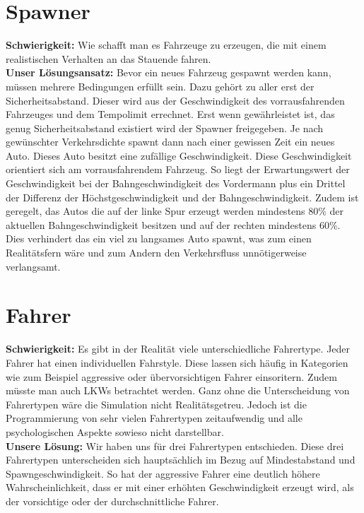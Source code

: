 \section{Spawner}
\textbf{Schwierigkeit:} Wie schafft man es Fahrzeuge zu erzeugen, die mit einem realistischen Verhalten an das Stauende fahren.\\
\textbf{Unser Lösungsansatz:} Bevor ein neues Fahrzeug gespawnt werden kann, müssen mehrere Bedingungen erfüllt sein. Dazu gehört zu aller erst der Sicherheitsabstand. Dieser wird aus der Geschwindigkeit des vorrausfahrenden Fahrzeuges und dem Tempolimit errechnet. Erst wenn gewährleistet ist, das genug Sicherheitsabstand existiert wird der Spawner freigegeben. Je nach gewünschter Verkehrsdichte spawnt dann nach einer gewissen Zeit ein neues Auto. Dieses Auto besitzt eine zufällige Geschwindigkeit. Diese Geschwindigkeit orientiert sich am vorrausfahrendem Fahrzeug. So liegt der Erwartungswert der Geschwindigkeit bei der Bahngeschwindigkeit des Vordermann plus ein Drittel der Differenz der Höchstgeschwindigkeit und der Bahngeschwindigkeit. Zudem ist geregelt, das Autos die auf der linke Spur erzeugt werden mindestens 80\% der aktuellen Bahngeschwindigkeit besitzen und auf der rechten mindestens 60\%. Dies verhindert das ein viel zu langsames Auto spawnt, was zum einen Realitätsfern wäre und zum Andern den Verkehrsfluss unnötigerweise verlangsamt.\\
\section{Fahrer}
\textbf{Schwierigkeit:} Es gibt in der Realität viele unterschiedliche Fahrertype. Jeder Fahrer hat einen individuellen Fahrstyle. Diese lassen sich häufig in Kategorien wie zum Beispiel aggressive oder übervorsichtigen Fahrer einsoritern. Zudem müsste man auch LKWs betrachtet werden. Ganz ohne die Unterscheidung von Fahrertypen wäre die Simulation nicht Realitätsgetreu. Jedoch ist die Programmierung von sehr vielen Fahrertypen zeitaufwendig und alle psychologischen Aspekte sowieso nicht darstellbar.\\
\textbf{Unsere Lösung:} Wir haben uns für drei Fahrertypen entschieden. Diese drei Fahrertypen unterscheiden sich hauptsächlich im Bezug auf Mindestabstand und Spawngeschwindigkeit. So hat der aggressive Fahrer eine deutlich höhere Wahrscheinlichkeit, dass er mit einer erhöhten Geschwindigkeit erzeugt wird, als der vorsichtige oder der durchschnittliche Fahrer.